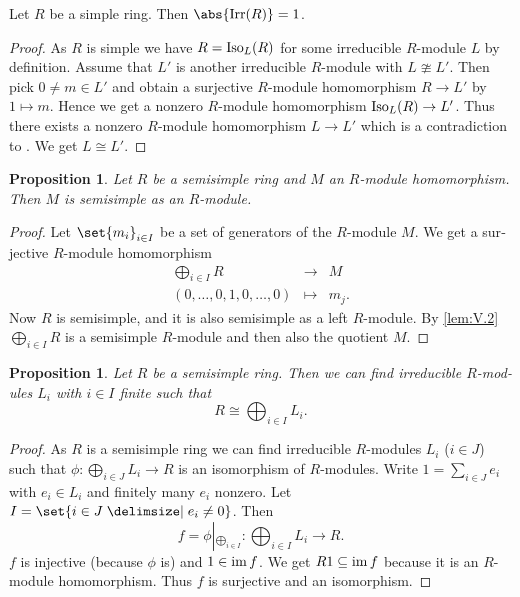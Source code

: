 \documentclass[12pt,a4paper]{scrartcl}
\theoremstyle{cplain}
\theoremstyle{cplain}
\theoremstyle{cplain}
\newtheorem{prop}[thmcounter]{Proposition}
\theoremstyle{definition}
\begin{document}
\begin{otherlanguage}{english}
\begin{lem} \label{lem:V.9} %
  Let $R$ be a simple ring. Then $\abs{\Irr(R)} = 1$.
\end{lem}
\begin{proof}
  As $R$ is simple we have $R=\operatorname{Iso}_L(R)$ for some irreducible $R$-module $L$ by definition. Assume that $L'$ is another irreducible $R$-module with $L\ncong L'$. Then pick $0\neq m\in L'$ and obtain a surjective $R$-module homomorphism $R\to L'$ by $1\mapsto m$. Hence we get a nonzero $R$-module homomorphism $\operatorname{Iso}_L(R) \to L'$. Thus there exists a nonzero $R$-module homomorphism $L\to L'$ which is a contradiction to . We get $L \cong L'$.
\end{proof}


\begin{prop} %
  Let $R$ be a semisimple ring and $M$ an $R$-module homomorphism. Then $M$ is semisimple as an $R$-module.
\end{prop}
\begin{proof}
  Let $\set{m_i}_{i\in I}$ be a set of generators of the $R$-module $M$. We get a surjective $R$-module homomorphism
  \begin{eqnarray*}
    \bigoplus_{i\in I}R &\to& M \\
    (0,\ldots,0,1,0,\ldots,0) &\mapsto& m_j.
  \end{eqnarray*}
  Now $R$ is semisimple, and it is also semisimple as a left $R$-module. By \cref{lem:V.2} $\bigoplus_{i\in I} R$ is a semisimple $R$-module and then also the quotient $M$.
\end{proof}

\begin{prop} \label{prop:V.11} %
  Let $R$ be a semisimple ring. Then we can find irreducible $R$-modules $L_i$ with $i\in I$ finite such that \[R \cong \bigoplus_{i\in I}L_i.\]
\end{prop}
\begin{proof}
  As $R$ is a semisimple ring we can find irreducible $R$-modules $L_i$ ($i\in J$) such that $\phi\colon \bigoplus_{i\in J}L_i \to R$ is an isomorphism of $R$-modules. Write $1 = \sum_{i\in J}e_i$ with $e_i\in L_i$ and finitely many $e_i$ nonzero. Let $I=\set{i\in J\given e_i\neq 0}$. Then \[f= \phi\left|_{\bigoplus_{i\in I}}\right.\colon \bigoplus_{i\in I}L_i \to R.\] $f$ is injective (because $\phi$ is) and $1\in\operatorname{im} f$. We get $R1 \subseteq \operatorname{im} f$ because it is an $R$-module homomorphism. Thus $f$ is surjective and an isomorphism.
\end{proof}


\end{otherlanguage}
\end{document}
